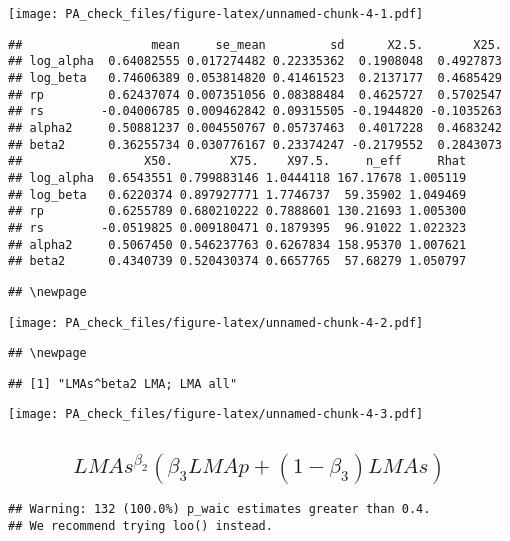 \documentclass[12pt,]{article}
\begin{document}
\texttt{[image: PA\_check\_files/figure-latex/unnamed-chunk-4-1.pdf]}

\begin{verbatim}
##                  mean     se_mean         sd      X2.5.       X25.
## log_alpha  0.64082555 0.017274482 0.22335362  0.1908048  0.4927873
## log_beta   0.74606389 0.053814820 0.41461523  0.2137177  0.4685429
## rp         0.62437074 0.007351056 0.08388484  0.4625727  0.5702547
## rs        -0.04006785 0.009462842 0.09315505 -0.1944820 -0.1035263
## alpha2     0.50881237 0.004550767 0.05737463  0.4017228  0.4683242
## beta2      0.36255734 0.030776167 0.23374247 -0.2179552  0.2843073
##                 X50.        X75.    X97.5.     n_eff     Rhat
## log_alpha  0.6543551 0.799883146 1.0444118 167.17678 1.005119
## log_beta   0.6220374 0.897927771 1.7746737  59.35902 1.049469
## rp         0.6255789 0.680210222 0.7888601 130.21693 1.005300
## rs        -0.0519825 0.009180471 0.1879395  96.91022 1.022323
## alpha2     0.5067450 0.546237763 0.6267834 158.95370 1.007621
## beta2      0.4340739 0.520430374 0.6657765  57.68279 1.050797
\end{verbatim}

\begin{verbatim}
## \newpage
\end{verbatim}

\texttt{[image: PA\_check\_files/figure-latex/unnamed-chunk-4-2.pdf]}

\begin{verbatim}
## \newpage
\end{verbatim}

\begin{verbatim}
## [1] "LMAs^beta2 LMA; LMA all"
\end{verbatim}

\texttt{[image: PA\_check\_files/figure-latex/unnamed-chunk-4-3.pdf]}

\subsection{\texorpdfstring{\[LMAs^{\beta_2}(\beta_3 LMAp + (1 - \beta_3) LMAs)\]}{LMAs\^{}\{\textbackslash{}beta\_2\}(\textbackslash{}beta\_3 LMAp + (1 - \textbackslash{}beta\_3) LMAs)}}\label{lmasbeta_2beta_3-lmap-1---beta_3-lmas}

\begin{verbatim}
## Warning: 132 (100.0%) p_waic estimates greater than 0.4.
## We recommend trying loo() instead.
\end{verbatim}
\end{document}

